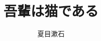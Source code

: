 ﻿\documentclass[a4paper, book, tate, twocolumn]{jlreq}%
\begin{document}
\title{吾輩は猫である}%
\author{夏目漱石}%
\maketitle

\end{document}
